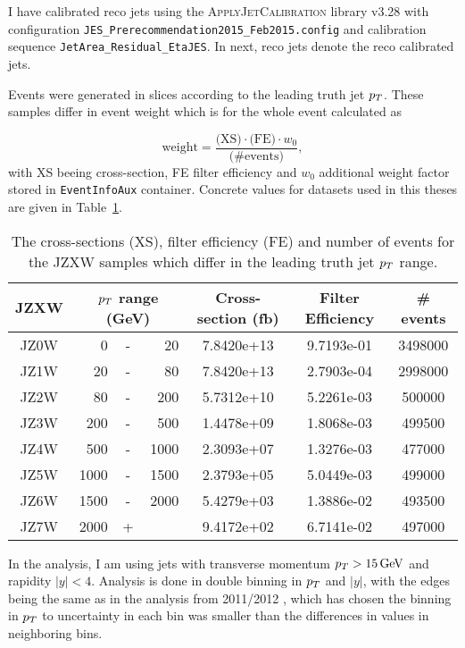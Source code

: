 I have calibrated reco jets using the \textsc{ApplyJetCalibration}
\cite{ApplyJetCalibration} library v3.28 with configuration 
\texttt{JES\_Prerecommendation2015\_Feb2015.config} and
calibration sequence \texttt{JetArea\_Residual\_EtaJES}. In next, reco jets
denote the reco calibrated jets.

Events were generated in slices according to the leading truth jet $p_{T}$. These
samples differ in event weight which is for the whole event calculated as 

\begin{equation}
  \text{weight} = \frac{\text{(XS)} \cdot \text{(FE)} \cdot w_0}{\text{(\# events)}},
\end{equation}
with XS beeing cross-section, FE filter efficiency and $w_0$ additional weight
factor stored in \texttt{EventInfoAux} container. Concrete values for datasets used in
this theses are given in Table~\ref{tab:JZXW}.  

\begin{table}
  \centering
  \begin{tabular}{|c|rcr|c|c|c|}
    \hline 
     JZXW & \multicolumn{3}{|c|}{$p_{T}$ range (GeV)} & Cross-section (fb) & Filter Efficiency & \# events  \\ 
    \hline
    \hline
		 JZ0W &     0 & - &    20 & 7.8420e+13 & 9.7193e-01 & 3498000 \\ 
    \hline
		 JZ1W &    20 & - &    80 & 7.8420e+13 & 2.7903e-04 & 2998000 \\
    \hline
		 JZ2W &    80 & - &   200 & 5.7312e+10 & 5.2261e-03 & 500000  \\
    \hline
		 JZ3W &   200 & - &   500 & 1.4478e+09 & 1.8068e-03 & 499500  \\
    \hline
		 JZ4W &   500 & - &  1000 & 2.3093e+07 & 1.3276e-03 & 477000  \\
    \hline
		 JZ5W &  1000 & - &  1500 & 2.3793e+05 & 5.0449e-03 & 499000  \\
    \hline
		 JZ6W &  1500 & - &  2000 & 5.4279e+03 & 1.3886e-02 & 493500  \\
    \hline
		 JZ7W &  2000 & + &       & 9.4172e+02 & 6.7141e-02 & 497000  \\
    \hline 
  \end{tabular}
  \caption{The cross-sections (XS), filter efficiency (FE) and number of events
  for the JZXW samples which differ in the leading truth jet $p_{T}$ range.}
  \label{tab:JZXW}
\end{table}

In the analysis, I am using jets with transverse momentum $p_{T}>15\,\text{GeV}$ and
rapidity $|y|<4$. Analysis is done in double binning in $p_{T}$ and $|y|$, with
the edges being the same as in the analysis from 2011/2012 \cite{Analysis2012},
which has chosen the binning in $p_{T}$ to uncertainty in each bin was smaller
than the differences in values in neighboring bins.

